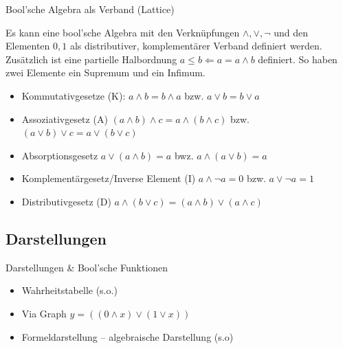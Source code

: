 \documentclass[12pt%
,aspectratio=169%
]{beamer}
\begin{document}
\begin{frame}{Bool'sche Algebra als Verband (Lattice)}
\begin{definition}
Es kann eine bool'sche Algebra mit den Verknüpfungen $\land, \lor, \neg$ und den Elementen $0,1$ als distributiver, komplementärer Verband definiert werden. Zusätzlich ist eine partielle Halbordnung $a \leq b \Leftarrow a = a \land b$ definiert. So haben zwei Elemente ein Supremum und ein Infimum.
\end{definition}
\begin{itemize}
	\item Kommutativgesetze (K): $a \land b = b \land a$ bzw. $a \lor b = b \lor a$
	\item Assoziativgesetz (A) $(a \land b ) \land c = a \land ( b \land c )$ bzw. $(a \lor b ) \lor c = a \lor ( b \lor c )$
	\item Absorptionsgesetz $a\lor(a\land b)=a$ bwz. $a\land (a\lor b)=a$
	\item Komplementärgesetz/Inverse Element (I) $a\land\neg a=0$ bzw. $a\lor\neg a=1$
	\item Distributivgesetz (D) $a \land ( b \lor c ) = ( a \land b ) \lor ( a \land c )$
\end{itemize}
\cite{sasao1999lattice}
\end{frame}

\subsection{Darstellungen}
\begin{frame}{Darstellungen \& Bool'sche Funktionen}
\begin{itemize}
	\item Wahrheitstabelle (s.o.)
	\item Via Graph $y = ((0 \land x) \lor (1 \lor x))$\\
	\item Formeldarstellung -- algebraische Darstellung (s.o)
\end{itemize}
\end{frame}
\end{document}
